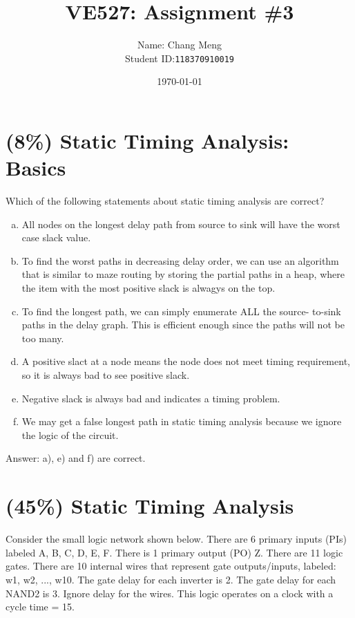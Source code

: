\documentclass[12pt]{article}
\title{VE527: Assignment \#3} %
\author{Name: Chang Meng\\Student ID:\@\texttt{118370910019}}
\date{\today}
\begin{document}
    \maketitle

    \section{(8\%) Static Timing Analysis: Basics}

    Which of the following statements about static timing analysis are
    correct?

    \begin{enumerate}[a)]
        \item All nodes on the longest delay path from source to sink will
            have the worst case slack value.
        \item To find the worst paths in decreasing delay order, we can use
            an algorithm that is similar to maze routing by storing the
            partial paths in a heap, where the item with the most positive
            slack is alwagys on the top.
        \item To find the longest path, we can simply enumerate ALL the source-
            to-sink paths in the delay graph. This is efficient enough since
            the paths will not be too many.
        \item A positive slact at a node means the node does not meet timing
            requirement, so it is always bad to see positive slack.
        \item Negative slack is always bad and indicates a timing problem.
        \item We may get a false longest path in static timing analysis because
            we ignore the logic of the circuit.
    \end{enumerate}

    \noindent
    Answer:
    a), e) and f) are correct.

    \section{(45\%) Static Timing Analysis}

    Consider the small logic network shown below. There are 6 primary inputs (PIs)
    labeled A, B, C, D, E, F. There is 1 primary output (PO) Z. There are 11 logic
    gates. There are 10 internal wires that represent gate outputs/inputs, labeled:
    w1, w2, ..., w10. The gate delay for each inverter is 2. The gate delay for each
    NAND2 is 3. Ignore delay for the wires. This logic operates on a clock with a
    cycle time = 15.
\end{document}

